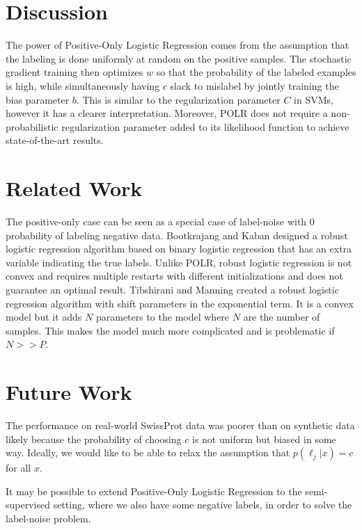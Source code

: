 \documentclass{article}
\begin{document}
\section{Discussion}

The power of Positive-Only Logistic Regression comes from the assumption that the labeling is done uniformly at random on the positive samples.  The stochastic gradient training then optimizes $w$ so that the probability of the labeled examples is high, while simultaneously having $c$ slack to mislabel by jointly training the bias parameter $b$.  This is similar to the regularization parameter $C$ in SVMs, however it has a clearer interpretation.  Moreover, POLR does not require a non-probabilistic regularization parameter added to its likelihood function to achieve state-of-the-art results.

\section{Related Work}

The positive-only case can be seen as a special case of label-noise with 0 probability of labeling negative data. Bootkrajang and Kaban  designed a robust logistic regression algorithm based on binary logistic regression that has an extra variable indicating the true labels.  Unlike POLR, robust logistic regression is not convex and requires multiple restarts with different initializations and does not guarantee an optimal result. Tibshirani and Manning  created a robust logistic regression algorithm with  shift parameters in the exponential term.  It is a convex model but it adds $N$ parameters to the model where $N$ are the number of samples.  This makes the model much more complicated and is problematic if $N >> P$.

\section{Future Work}

The performance on real-world SwissProt data was poorer than on synthetic data likely because the probability of choosing $c$ is not uniform but biased in some way. Ideally, we would like to be able to relax the assumption that $p(\ell_j|x)=c$ for all $x$.  

It may be possible to extend Positive-Only Logistic Regression to the semi-supervised setting, where we also have some negative labels, in order to solve the label-noise problem.
\end{document}
